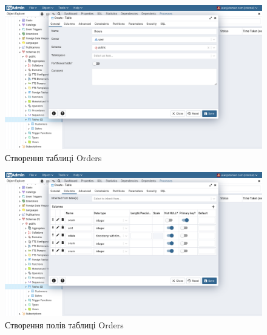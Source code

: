 \documentclass[14pt]{extreport}
\begin{document}
\begin{normalsize}
	\begin{figure}[H]
		\centering
		\includegraphics[scale=0.35]{13}
		\caption{Створення таблиці Orders}
	\end{figure}
	
	\begin{figure}[H]
		\centering
		\includegraphics[scale=0.35]{14}
		\caption{Створення полів таблиці Orders}
	\end{figure}
	

\end{normalsize}
\end{document}
